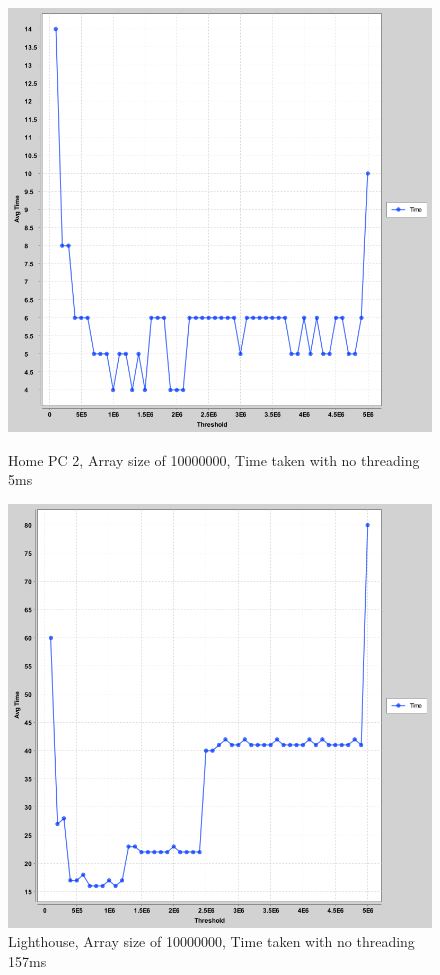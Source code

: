 \documentclass[a4paper, 12pt]{article}
\begin{document}
		\begin{figure}[H]
%
  \includegraphics[width=\linewidth]{thres-vs-time-pc-2.png}
  \caption{Home PC 2, Array size of 10000000, Time taken with no threading 5ms}
\endminipage\hfill
{}%
  \includegraphics[width=\linewidth]{thres-vs-time-lighthouse.png}
  \caption{Lighthouse, Array size of 10000000, Time taken with no threading 157ms}
\endminipage\hfill
		\end{figure}		
	
\end{document}
